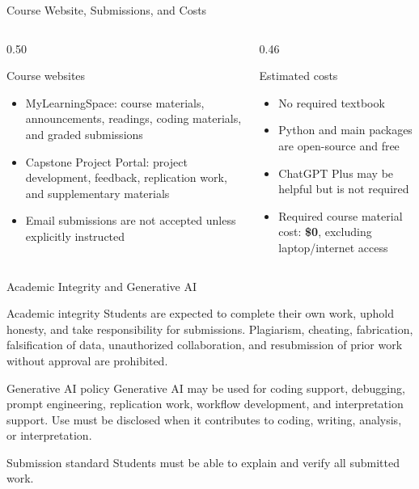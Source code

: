 \documentclass[aspectratio=169,11pt]{beamer}
\begin{document}
\begin{frame}{Course Website, Submissions, and Costs}
\begin{columns}[T,onlytextwidth]
\begin{column}{0.50\textwidth}
\begin{block}{Course websites}
\begin{itemize}
    \item MyLearningSpace: course materials, announcements, readings, coding materials, and graded submissions
    \item Capstone Project Portal: project development, feedback, replication work, and supplementary materials
    \item Email submissions are not accepted unless explicitly instructed
\end{itemize}
\end{block}
\end{column}
\begin{column}{0.46\textwidth}
\begin{block}{Estimated costs}
\begin{itemize}
    \item No required textbook
    \item Python and main packages are open-source and free
    \item ChatGPT Plus may be helpful but is not required
    \item Required course material cost: \textbf{\$0}, excluding laptop/internet access
\end{itemize}
\end{block}
\end{column}
\end{columns}
\end{frame}

\begin{frame}{Academic Integrity and Generative AI}
\begin{block}{Academic integrity}
Students are expected to complete their own work, uphold honesty, and take responsibility for submissions. Plagiarism, cheating, fabrication, falsification of data, unauthorized collaboration, and resubmission of prior work without approval are prohibited.
\end{block}

\vspace{0.25em}
\begin{block}{Generative AI policy}
Generative AI may be used for coding support, debugging, prompt engineering, replication work, workflow development, and interpretation support. Use must be disclosed when it contributes to coding, writing, analysis, or interpretation.
\end{block}

\vspace{0.25em}
\begin{alertblock}{Submission standard}
Students must be able to explain and verify all submitted work.
\end{alertblock}
\end{frame}
\end{document}
